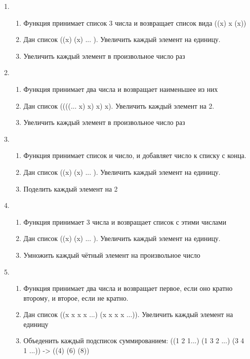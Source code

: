 \documentclass[a4paper,12pt]{article}
\begin{document}
\begin{enumerate}
	\item \begin{enumerate}
		\item Функция принимает список 3 числа и возвращает список вида ((x) x (x))
		\item Дан список ((x) (x) ... ). Увеличить каждый элемент на единицу.
		\item Увеличить каждый элемент в произвольное число раз
	\end{enumerate}

	\item \begin{enumerate}
		\item Функция принимает два числа и возвращает наименьшее из них
		\item Дан список ((((... x) x) x) x). Увеличить каждый элемент на 2.
		\item Увеличить каждый элемент в произвольное число раз
	\end{enumerate}

	\item \begin{enumerate}
		\item Функция принимает список и число, и добавляет число к списку с конца.
		\item Дан список ((x) (x) ... ). Увеличить каждый элемент на единицу.
		\item Поделить каждый элемент на 2
	\end{enumerate}

	\item \begin{enumerate}
		\item Функция принимает 3 числа и возвращает список с этими числами
		\item Дан список ((x) (x) ... ). Увеличить каждый элемент на единицу.
		\item Умножить каждый чётный элемент на произвольное число
	\end{enumerate}

	\item \begin{enumerate}
		\item Функция принимает два числа и возвращает первое, если оно кратно второму, и второе, если не кратно.
		\item Дан список ((x x x x ...) (x x x x ...)). Увеличить каждый элемент на единицу
		\item Объеденить каждый подсписок суммированием: ((1 2 1...) (1 3 2 ...) (3 4 1 ...)) -> ((4) (6) (8))
	\end{enumerate}

\end{enumerate}
\end{document}

